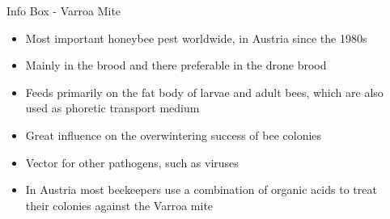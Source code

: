 \documentclass{beamer}
\begin{document}
\begin{frame}{}
\begin{columns}[t]
\begin{column}{0.49\textwidth}
  \end{column}

  \begin{column}{0.49\textwidth}  
    {
      \begin{block}{Info Box - Varroa Mite}
      \setlength{\leftmargini}{95pt}
        \begin{itemize}
            \setlength{\itemindent}{-30pt}
            \item Most important honeybee pest worldwide, in Austria since the 1980s
            \item Mainly in the brood and there preferable in the drone brood \citep{rosenkranz2010}
            \item Feeds primarily on the fat body of larvae and adult bees, which are also used as phoretic transport medium \citep{ramsey2019}
            \item Great influence on the overwintering success of bee colonies \citep{dahle2010}
            \item Vector for other pathogens, such as viruses \citep{rosenkranz2010, noel2020}
            \item In Austria most beekeepers use a combination of organic acids to treat their colonies against the Varroa mite \citep{moosbeckhofer2015, oberreiter2020}
        \end{itemize}


\end{block}}
\end{column}
\end{columns}
\end{frame}
\end{document}
